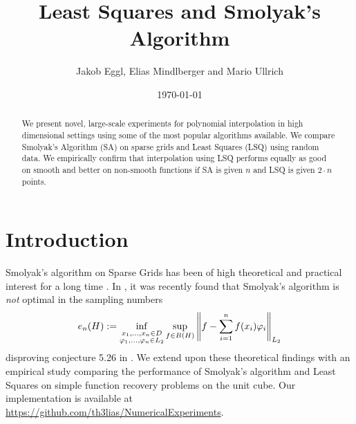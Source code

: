 \documentclass[12pt, oneside]{amsart}
\theoremstyle{definition}
\theoremstyle{remark}
\numberwithin{equation}{section}
\begin{document}
\title{Least Squares and Smolyak's Algorithm}


\author{Jakob Eggl, Elias Mindlberger and Mario Ullrich}
\date{\today}

%
%



\begin{abstract}
We present novel, large-scale experiments for polynomial interpolation in high 
dimensional settings using some of the most popular algorithms available. We 
compare Smolyak's Algorithm (SA) on sparse grids and Least Squares (LSQ) using 
random data. We empirically confirm that interpolation using LSQ performs 
equally as good on smooth and better on non-smooth functions if SA is given 
\(n\) and LSQ is given \(2 \cdot n\) points.
\end{abstract}

\maketitle


\section{Introduction}

Smolyak's algorithm on Sparse Grids has been of high theoretical and practical 
interest for a long time \cite{BarthelmannHighDim_2000,smolyak1963,Coleman_SmoylakGithub_2013,JuddSmolyak_2014}. In \cite{Krieg_2020}, it was recently found that Smolyak's algorithm is \emph{not} optimal in the sampling numbers
\[
    e_n(H) \defn \inf_{\substack{x_1, \dots, x_n \in D \\ \phi_1, \dots, \phi_n 
    \in L_2}} \sup_{f \in B(H)} \norm[L_2]{f - \sum_{i=1}^n f(x_i) \phi_i}
\] %
disproving conjecture 5.26 in \cite{Dung_Temlyakov_Ullrich_2018}. We extend upon these theoretical findings with an empirical study comparing the performance of Smolyak's algorithm and Least Squares on simple function recovery problems on the unit cube. Our implementation is available at \url{https://github.com/th3lias/NumericalExperiments}.
\end{document}
